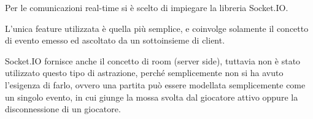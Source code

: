 Per le comunicazioni real-time si è scelto di impiegare la libreria Socket.IO.

L'unica feature utilizzata è quella più semplice, e coinvolge solamente il concetto di evento emesso ed ascoltato da un sottoinsieme di client.

Socket.IO fornisce anche il concetto di room (server side), tuttavia non è stato utilizzato questo tipo di astrazione, perché semplicemente non si ha avuto l'esigenza di farlo, ovvero una partita può essere modellata semplicemente come un singolo evento, in cui giunge la mossa svolta dal giocatore attivo oppure la disconnessione di un giocatore.

\newpage